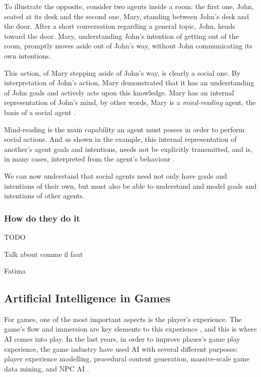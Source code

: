 To illustrate the opposite, consider two agents inside a room: the first one, John, seated at its desk and the second one, Mary, standing between John's desk and the door.
After a short conversation regarding a general topic, John, heads toward the door.
Mary, understanding John's intention of getting out of the room, promptly moves aside out of John's way, without John communicating its own intentions.

This action, of Mary stepping aside of John's way, is clearly a social one.
By interpretation of John's action, Mary demonstrated that it has an understanding of John goals and actively acts upon this knowledge.
Mary has an internal representation of John's mind, by other words, Mary is a \textit{mind-reading} agent, the basis of a social agent \cite{castelfranchi:socialactions}.

Mind-reading is the main capability an agent must posses in order to perform social actions.
And as shown in the example, this internal representation of another's agent goals and intentions, needs not be explicitly transmitted, and is, in many cases, interpreted from the agent's behaviour \cite{castelfranchi:socialactions}.

We can now understand that social agents need not only have goals and intentions of their own, but must also be able to understand and model goals and intentions of other agents.

\subsubsection{How do they do it}
TODO

Talk about comme il faut

Fatima


\subsection{Artificial Intelligence in Games}

For games, one of the most important aspects is the player's experience.
The game's flow and immersion are key elements to this experience \cite{ijsselsteijn:userexperience}, and this is where \ac{AI} comes into play.
In the last years, in order to improve plauer's game play experience, the game industry have used \ac{AI} with several different purposes: player experience modelling, procedural content generation, massive-scale game data mining, and \ac{NPC} \ac{AI} \cite{yannakakis:gameairevisited}.

